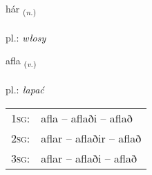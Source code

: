 \documentclass[frontgrid, backgrid]{flacards}\usepackage[]{graphicx}\usepackage[]{xcolor}
\begin{document}
\renewcommand{\flhead}{\vskip5pt \fboxsep=0pt {\small\bfseries\footnotesize Nafnorð | Noun}}
\renewcommand{\fcfoot}{\vskip5pt \fboxsep=0pt \hspace{2pt}{\small\bfseries\footnotesize 2K}}

\renewcommand{\blhead}{\vskip5pt {\small\bfseries\footnotesize Nafnorð | Noun }}
\renewcommand{\bcfoot}{\vskip5pt \hspace{2pt}{\small\bfseries\footnotesize 2K}}


{hár \small{\textsubscript{(\textit{n.})}} \\[1ex] %
\textphonetic{[hauːr]} \\
pl.: \emph{włosy} \\  [2ex]
\renewcommand*{\arraystretch}{0.8}
}

\renewcommand{\flhead}{\vskip5pt \fboxsep=0pt {\small\bfseries\footnotesize Sagnorð | Verb}}
\renewcommand{\fcfoot}{\vskip5pt \fboxsep=0pt \hspace{2pt}{\small\bfseries\footnotesize 2K}}

\renewcommand{\blhead}{\vskip5pt {\small\bfseries\footnotesize Sagnorð | Verb }}
\renewcommand{\bcfoot}{\vskip5pt \hspace{2pt}{\small\bfseries\footnotesize 2K}}


{afla \small{\textsubscript{(\textit{v.})}} \\[1ex] %
\textphonetic{[apla]} \\
pl.: \emph{łapać} \\  [2ex]
\renewcommand*{\arraystretch}{0.8}
\begin{tabular}{p{1cm}l}
\textsc{1sg}: & afla -- aflaði -- aflað \\ 
\textsc{2sg}: & aflar -- aflaðir -- aflað \\ 
\textsc{3sg}: & aflar -- aflaði -- aflað \\ 
\end{tabular}
}
\end{document}
